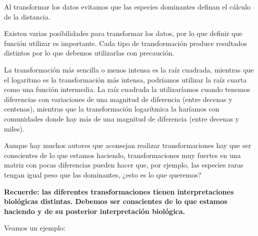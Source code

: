 \documentclass[]{book}
\begin{document}
Al transformar los datos evitamos que las especies dominantes definan el
cálculo de la distancia.

Existen varias posibilidades para transformar los datos, por lo que
definir que función utilizar es importante. Cada tipo de transformación
produce resultados distintos por lo que debemos utilizarlas con
precaución.

La transformación más sencilla o menos intensa es la raíz cuadrada,
mientras que el logaritmo es la transformación más intensa, podríamos
utilizar la raíz cuarta como una función intermedia. La raíz cuadrada la
utilizaríamos cuando tenemos diferencias con variaciones de una magnitud
de diferencia (entre decenas y centenas), mientras que la transformación
logarítmica la haríamos con comunidades donde hay más de una magnitud de
diferencia (entre decenas y miles).

Aunque hay muchos autores que aconsejan realizar transformaciones hay
que ser conscientes de lo que estamos haciendo, transformaciones muy
fuertes en una matriz con pocas diferencias pueden hacer que, por
ejemplo, las especies raras tengan igual peso que las dominantes, ¿esto
es lo que queremos?

\textbf{Recuerde: las diferentes transformaciones tienen
interpretaciones biológicas distintas. Debemos ser conscientes de lo que
estamos haciendo y de su posterior interpretación biológica.}

Veamos un ejemplo:
\end{document}
